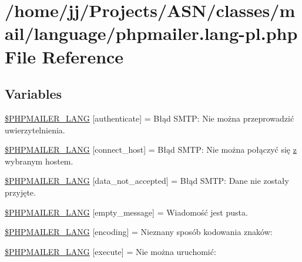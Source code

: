 \hypertarget{phpmailer_8lang-pl_8php}{}\section{/home/jj/\+Projects/\+A\+S\+N/classes/mail/language/phpmailer.lang-\/pl.php File Reference}
\label{phpmailer_8lang-pl_8php}
\subsection*{Variables}
\begin{DoxyCompactItemize}
\item 
\hyperlink{phpmailer_8lang-pl_8php_a2cb33073c989b85580748e331ed8b4aa}{\$\+P\+H\+P\+M\+A\+I\+L\+E\+R\+\_\+\+L\+A\+NG} \mbox{[}\textquotesingle{}authenticate\textquotesingle{}\mbox{]} = \textquotesingle{}Błąd S\+M\+T\+P\+: Nie można przeprowadzić uwierzytelnienia.\textquotesingle{}
\item 
\hyperlink{phpmailer_8lang-pl_8php_a2ee0cc637a06b96e45600db31c6799ee}{\$\+P\+H\+P\+M\+A\+I\+L\+E\+R\+\_\+\+L\+A\+NG} \mbox{[}\textquotesingle{}connect\+\_\+host\textquotesingle{}\mbox{]} = \textquotesingle{}Błąd S\+M\+T\+P\+: Nie można połączyć się \hyperlink{_chart_8min_8js_a4a73770ab69578dc29ec14afeaf50228}{z} wybranym hostem.\textquotesingle{}
\item 
\hyperlink{phpmailer_8lang-pl_8php_a814c6b191205d2361b3233e9c9d6fda5}{\$\+P\+H\+P\+M\+A\+I\+L\+E\+R\+\_\+\+L\+A\+NG} \mbox{[}\textquotesingle{}data\+\_\+not\+\_\+accepted\textquotesingle{}\mbox{]} = \textquotesingle{}Błąd S\+M\+T\+P\+: Dane nie zostały przyjęte.\textquotesingle{}
\item 
\hyperlink{phpmailer_8lang-pl_8php_a33772099f637c9d6c2cd7425e0e37fed}{\$\+P\+H\+P\+M\+A\+I\+L\+E\+R\+\_\+\+L\+A\+NG} \mbox{[}\textquotesingle{}empty\+\_\+message\textquotesingle{}\mbox{]} = \textquotesingle{}Wiadomość jest pusta.\textquotesingle{}
\item 
\hyperlink{phpmailer_8lang-pl_8php_a817f7283f3d54c970a0c10305cc668cc}{\$\+P\+H\+P\+M\+A\+I\+L\+E\+R\+\_\+\+L\+A\+NG} \mbox{[}\textquotesingle{}encoding\textquotesingle{}\mbox{]} = \textquotesingle{}Nieznany sposób kodowania znaków\+: \textquotesingle{}
\item 
\hyperlink{phpmailer_8lang-pl_8php_a668217a9563a168f30f2a8548b6ed5a9}{\$\+P\+H\+P\+M\+A\+I\+L\+E\+R\+\_\+\+L\+A\+NG} \mbox{[}\textquotesingle{}execute\textquotesingle{}\mbox{]} = \textquotesingle{}Nie można uruchomić\+: \textquotesingle{}

\end{DoxyCompactItemize}
